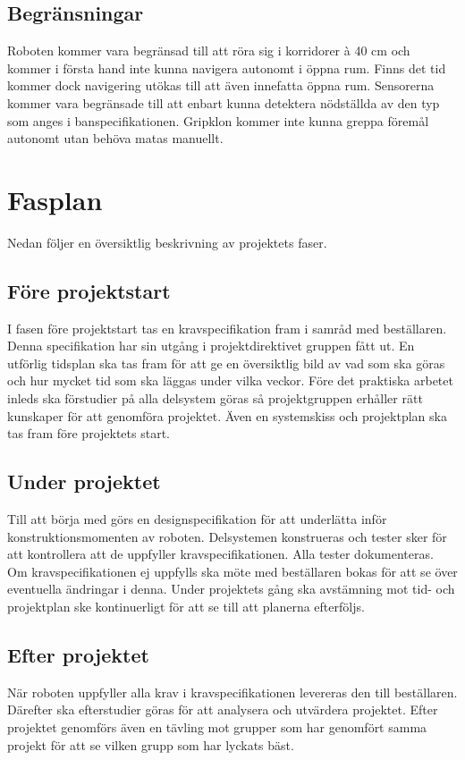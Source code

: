 \documentclass[11pt]{article}
\begin{document}
\begin{flushleft}
\subsection{Begränsningar}
Roboten kommer vara begränsad till att röra sig i korridorer à 40 cm och kommer i första hand inte kunna navigera autonomt i öppna rum. Finns det tid kommer dock navigering utökas till att även innefatta öppna rum. Sensorerna kommer vara begränsade till att enbart kunna detektera nödställda av den typ som anges i banspecifikationen. Gripklon kommer inte kunna greppa föremål autonomt utan behöva matas manuellt.

\pagebreak
\section{Fasplan}
Nedan följer en översiktlig beskrivning av projektets faser.
\subsection{Före projektstart}
I fasen före projektstart tas en kravspecifikation fram i samråd med beställaren. Denna specifikation har sin utgång i projektdirektivet gruppen fått ut. En utförlig tidsplan ska tas fram för att ge en översiktlig bild av vad som ska göras och hur mycket tid som ska läggas under vilka veckor. Före det praktiska arbetet inleds ska förstudier på alla delsystem göras så projektgruppen erhåller rätt kunskaper för att genomföra projektet. Även en systemskiss och projektplan ska tas fram före projektets start.

\subsection{Under projektet}
Till att börja med görs en designspecifikation för att underlätta inför konstruktionsmomenten av roboten. Delsystemen konstrueras och tester sker för att kontrollera att de uppfyller kravspecifikationen. Alla tester dokumenteras. Om kravspecifikationen ej uppfylls ska möte med beställaren bokas för att se över eventuella ändringar i denna. Under projektets gång ska avstämning mot tid- och projektplan ske kontinuerligt för att se till att planerna efterföljs.

\subsection{Efter projektet}
När roboten uppfyller alla krav i kravspecifikationen levereras den till beställaren. Därefter ska efterstudier göras för att analysera och utvärdera projektet. Efter projektet genomförs även en tävling mot grupper som har genomfört samma projekt för att se vilken grupp som har lyckats bäst. 


\end{flushleft}
\end{document}
